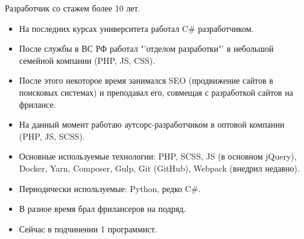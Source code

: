 \begin{minipage}[t]{0.55\textwidth} %
	\vspace{-\baselineskip} %


	Разработчик со стажем более 10 лет.
  \bigskip
  \small{
    \begin{itemize}[leftmargin=1pt]
      \item На последних курсах университета работал C\# разработчиком.
      \item После службы в ВС РФ работал "'отделом разработки"' в небольшой семейной компании (PHP, JS, CSS).
      \item После этого некоторое время занимался SEO (продвижение сайтов в поисковых системах) и преподавал его, совмещая с разработкой сайтов на фрилансе.
      \item На данный момент работаю аутсорс-разработчиком в оптовой компании (PHP, JS, SCSS).
      \item{Основные используемые технологии: PHP, SCSS, JS (в основном jQuery), Docker, Yarn, Composer, Gulp, Git (GitHub), Webpack (внедрил недавно).}
      \item Периодически используемые: Python, редко C\#.
      \item В разное время брал фрилансеров на подряд.
      \item Сейчас в подчинении 1 программист.
    \end{itemize}
  }
\end{minipage}
\hfill %
\begin{minipage}[t]{0.35\textwidth} %
	 \vspace{-\baselineskip} %

   
\end{minipage}





